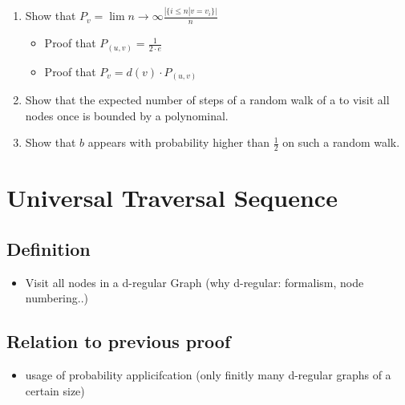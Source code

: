 \begin{enumerate}
\def\labelenumi{\arabic{enumi}.}
\item
  Show that
  $P_v = \lim{n \longrightarrow \infty} \frac{|\{i \leq n | v = v_i\}|}{n}$

  \begin{itemize}
  \itemsep1pt\parskip0pt
  \item
    Proof that $P_{(u, v)} = \frac{1}{2 \cdot e}$
  \item
    Proof that $P_v = d(v) \cdot P_{(u, v)}$
  \end{itemize}
\item
  Show that the expected number of steps of a random walk of a to visit
  all nodes once is bounded by a polynominal.
\item
  Show that $b$ appears with probability higher than $\frac{1}{2}$ on
  such a random walk.
\end{enumerate}

\chapter{Universal Traversal
Sequence}\label{universal-traversal-sequence}

\section{Definition}\label{definition}

\begin{itemize}
\itemsep1pt\parskip0pt
\item
  Visit all nodes in a d-regular Graph (why d-regular: formalism, node
  numbering..)
\end{itemize}

\section{Relation to previous proof}\label{relation-to-previous-proof}

\begin{itemize}
\itemsep1pt\parskip0pt
\item
  usage of probability applicifcation (only finitly many d-regular
  graphs of a certain size)
\end{itemize}



